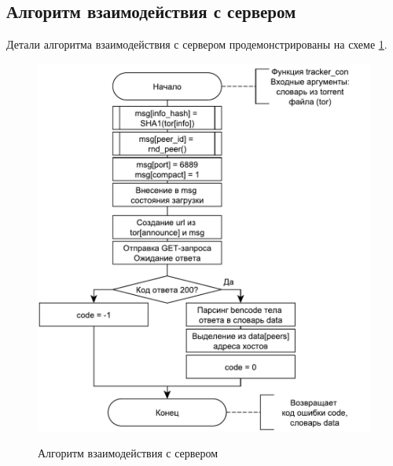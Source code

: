 \newpage

\subsection{Алгоритм взаимодействия с сервером}
Детали алгоритма взаимодействия с сервером продемонстрированы на схеме \ref{fig201:image}.
\begin{figure}[h]
	\begin{center}
		{\includegraphics[scale = 0.75]{img/server.pdf}}
		\caption{Алгоритм взаимодействия с сервером}
		\label{fig201:image}
	\end{center}
\end{figure}

\newpage

